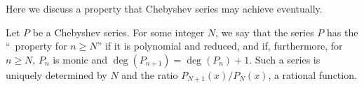 
Here we discuss a property that Chebyshev series may 
achieve eventually. 

\newcommand{\rampsfrom}{ramps from}   %


\mdef\label{def:chebycond} 
Let $P$ be a 
Chebyshev series. For some integer $N$, we say that the series $P$ 
has the ``\ramping\ property 
for $n\geq N$'' if it is polynomial and reduced, and if, furthermore, for $n\geq N$, $P_n$ is monic and $\deg(P_{n+1})=\deg(P_{n})+1$. 
Such a series is uniquely determined by $N$ and the ratio $P_{N+1}(x)/P_{N}(x)$, a rational function.





